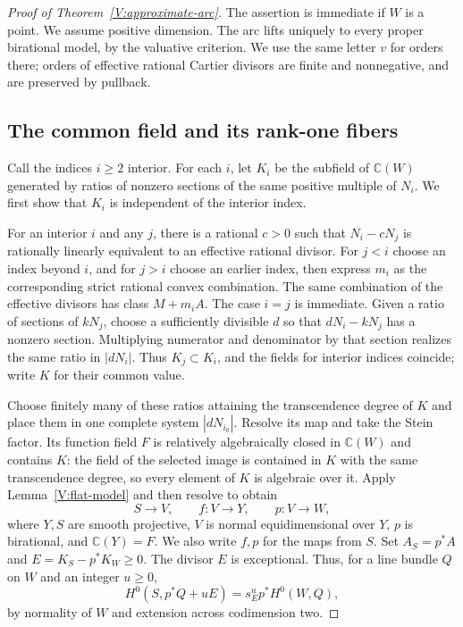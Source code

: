 \begin{proof}[Proof of Theorem~\ref{V:approximate-arc}]
The assertion is immediate if $W$ is a point.  We assume positive
dimension.  The arc lifts uniquely to every proper birational model,
by the valuative criterion.  We use the same letter $v$ for orders
there; orders of effective rational Cartier divisors are finite and
nonnegative, and are preserved by pullback.

\subsection*{The common field and its rank-one fibers}

Call the indices $i\ge2$ interior.  For each $i$, let $K_i$ be the
subfield of $\mathbb C(W)$ generated by ratios of nonzero sections
of the same positive multiple of $N_i$.  We first show that $K_i$
is independent of the interior index.

For an interior $i$ and any $j$, there is a rational $c>0$ such that
$N_i-cN_j$ is rationally linearly equivalent to an effective rational
divisor.  For $j<i$ choose an index beyond $i$, and for $j>i$ choose
an earlier index, then express $m_i$ as the corresponding strict
rational convex combination.  The same combination of the effective
divisors has class $M+m_iA$.  The case $i=j$ is immediate.  Given
a ratio of sections of $kN_j$, choose a sufficiently divisible $d$
so that $dN_i-kN_j$ has a nonzero section.  Multiplying numerator
and denominator by that section realizes the same ratio in $|dN_i|$.
Thus $K_j\subset K_i$, and the fields for interior indices coincide;
write $K$ for their common value.

Choose finitely many of these ratios attaining the transcendence
degree of $K$ and place them in one complete system $|dN_{i_0}|$.
Resolve its map and take the Stein factor.  Its function field $F$
is relatively algebraically closed in $\mathbb C(W)$ and contains
$K$: the field of the selected image is contained in $K$ with the
same transcendence degree, so every element of $K$ is algebraic over
it.  Apply Lemma~\ref{V:flat-model} and then resolve to obtain
\[
 S\longrightarrow V,\qquad f:V\longrightarrow Y,
 \qquad p:V\longrightarrow W,
\]
where $Y,S$ are smooth projective, $V$ is normal equidimensional over
$Y$, $p$ is birational, and $\mathbb C(Y)=F$.  We also write $f,p$
for the maps from $S$.  Set $A_S=p^*A$ and
$E=K_S-p^*K_W\ge0$.  The divisor $E$ is exceptional.  Thus, for a
line bundle $Q$ on $W$ and an integer $u\ge0$,
\[
 H^0(S,p^*Q+uE)=s_E^u p^*H^0(W,Q),
\]
by normality of $W$ and extension across codimension two.


\end{proof}
